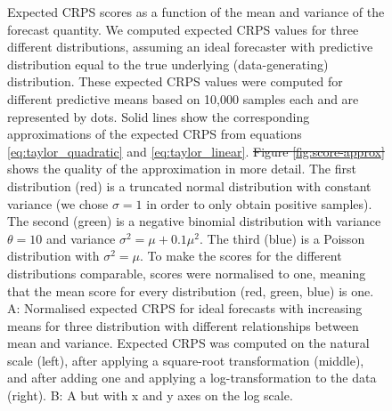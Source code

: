 \documentclass[10pt,letterpaper]{article} %
\providecommand{\DIFdeltex}[1]{{\protect\color{red}\sout{#1}}}                      %
\providecommand{\DIFdelFL}[1]{\DIFdel{#1}} %
\providecommand{\DIFaddbeginFL}{} %
\providecommand{\DIFaddendFL}{} %
\providecommand{\DIFdelbeginFL}{} %
\providecommand{\DIFdelendFL}{} %
\providecommand{\DIFdel}[1]{\texorpdfstring{\DIFdeltex{#1}}{}} %
\newcommand{\DIFscaledelfig}{0.5}
\newlength{\DIFdelgraphicswidth} %
\newlength{\DIFdelgraphicsheight} %
\newcommand{\DIFaddincludegraphics}[2][]{{\color{blue}\fbox{\DIFOincludegraphics[#1]{#2}}}} %
\newcommand{\DIFdelincludegraphics}[2][]{%
\sbox{\DIFdelgraphicsbox}{\DIFOincludegraphics[#1]{#2}}%
\settoboxwidth{\DIFdelgraphicswidth}{\DIFdelgraphicsbox} %
\settoboxtotalheight{\DIFdelgraphicsheight}{\DIFdelgraphicsbox} %
\scalebox{\DIFscaledelfig}{%
\parbox[b]{\DIFdelgraphicswidth}{\usebox{\DIFdelgraphicsbox}\\[-\baselineskip] \rule{\DIFdelgraphicswidth}{0em}}\llap{\resizebox{\DIFdelgraphicswidth}{\DIFdelgraphicsheight}{%
\setlength{\unitlength}{\DIFdelgraphicswidth}%
\begin{picture}(1,1)%
\thicklines\linethickness{2pt} %
{\color[rgb]{1,0,0}\put(0,0){\framebox(1,1){}}}%
{\color[rgb]{1,0,0}\put(0,0){\line( 1,1){1}}}%
{\color[rgb]{1,0,0}\put(0,1){\line(1,-1){1}}}%
\end{picture}%
}\hspace*{3pt}}} %
} %
\DeclareRobustCommand{\DIFaddbeginFL}{\DIFOaddbeginFL \let\includegraphics\DIFaddincludegraphics} %
\DeclareRobustCommand{\DIFaddendFL}{\DIFOaddendFL \let\includegraphics\DIFOincludegraphics} %
\DeclareRobustCommand{\DIFdelbeginFL}{\DIFOdelbeginFL \let\includegraphics\DIFdelincludegraphics} %
\DeclareRobustCommand{\DIFdelendFL}{\DIFOaddendFL \let\includegraphics\DIFOincludegraphics} %
\begin{document}
\begin{figure}[h!]
    \centering
    \DIFdelbeginFL %
\DIFdelendFL \caption{Expected CRPS scores as a function of the mean and variance of the forecast quantity. We computed expected CRPS values  for three different distributions, assuming an ideal forecaster with predictive distribution equal to the true underlying (data-generating) distribution. 
    These expected CRPS values were computed for different predictive means based on 10,000 samples each and are represented by dots. Solid lines show the corresponding approximations of the expected CRPS from equations \eqref{eq:taylor_quadratic} and \eqref{eq:taylor_linear}. \DIFdelbeginFL \DIFdelFL{Figure \ref{fig:score-approx} }\DIFdelendFL \DIFaddbeginFL {} \DIFaddendFL shows the quality of the approximation in more detail. 
    The first distribution (red) is a truncated normal distribution with constant variance (we chose $\sigma = 1$ in order to only obtain positive samples). The second (green) is a negative binomial distribution with variance $\theta = 10$ and variance $\sigma^2 = \mu + 0.1\mu^2$. The third (blue) is a
    Poisson distribution with $\sigma^2 = \mu$. To make the scores for the different distributions comparable, scores were normalised to one, meaning that the mean score for every distribution (red, green, blue) is one. 
    A: Normalised expected CRPS for ideal forecasts with increasing means for three distribution with different relationships between mean and variance. Expected CRPS was computed on the natural scale (left), after applying a square-root transformation (middle), and after adding one and applying a log-transformation to the data (right). B: A but with x and y axes on the log scale.}
    \label{fig:SIM-wis-state-size-mean}
\end{figure}
\end{document}
